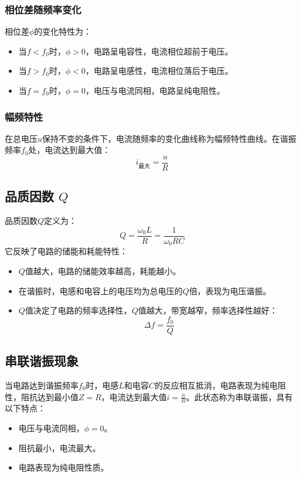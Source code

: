 \documentclass[a4paper,10pt]{article}
\begin{document}
\subsubsection{相位差随频率变化}

相位差\( \phi \)的变化特性为：
\begin{itemize}
    \item 当\( f < f_0 \)时，\( \phi > 0 \)，电路呈电容性，电流相位超前于电压。
    \item 当\( f > f_0 \)时，\( \phi < 0 \)，电路呈电感性，电流相位落后于电压。
    \item 当\( f = f_0 \)时，\( \phi = 0 \)，电压与电流同相，电路呈纯电阻性。
\end{itemize}

\subsubsection{幅频特性}

在总电压\( u \)保持不变的条件下，电流随频率的变化曲线称为幅频特性曲线。在谐振频率\( f_0 \)处，电流达到最大值：
\[
i_{\text{最大}} = \frac{u}{R}
\]

\subsection{品质因数 \( Q \) }

品质因数\( Q \)定义为：
\[
Q = \frac{\omega_0 L}{R} = \frac{1}{\omega_0 R C}
\]
它反映了电路的储能和耗能特性：
\begin{itemize}
    \item \( Q \)值越大，电路的储能效率越高，耗能越小。
    \item 在谐振时，电感和电容上的电压均为总电压的\( Q \)倍，表现为电压谐振。
    \item \( Q \)值决定了电路的频率选择性，\( Q \)值越大，带宽越窄，频率选择性越好：
    \[
    \Delta f = \frac{f_0}{Q}
    \]
\end{itemize}

\subsection{串联谐振现象}

当电路达到谐振频率\( f_0 \)时，电感\( L \)和电容\( C \)的反应相互抵消，电路表现为纯电阻性，阻抗达到最小值\( Z = R \)，电流达到最大值\( i = \frac{u}{R} \)。此状态称为串联谐振，具有以下特点：
\begin{itemize}
    \item 电压与电流同相，\( \phi = 0 \)。
    \item 阻抗最小，电流最大。
    \item 电路表现为纯电阻性质。
\end{itemize}
\end{document}
